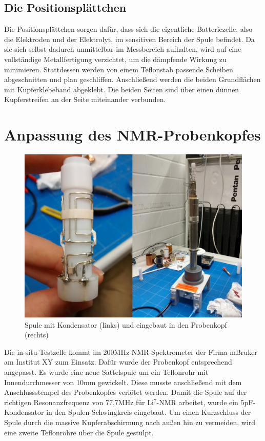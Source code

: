 \documentclass[a4paper, 11pt, headsepline,footsepline,twoside,abstract]{scrbook}
\begin{document}
\subsection{Die Positionsplättchen}
Die Positionsplättchen sorgen dafür, dass sich die eigentliche Batteriezelle, also die Elektroden und der Elektrolyt, im sensitiven Bereich der Spule befindet. Da sie sich selbst dadurch unmittelbar im Messbereich aufhalten, wird auf eine vollständige Metallfertigung verzichtet, um die dämpfende Wirkung zu minimieren. Stattdessen werden von einem Teflonstab passende Scheiben abgeschnitten und plan geschliffen. Anschließend werden die beiden Grundflächen mit Kupferklebeband abgeklebt. Die beiden Seiten sind über einen dünnen Kupferstreifen an der Seite miteinander verbunden. 
\section{Anpassung des NMR-Probenkopfes}
\begin{figure}
	\centering
	\includegraphics[width=0.85\columnwidth]{images/Platzhalter_Spule.jpg}
	\caption{Spule mit Kondensator (links) und eingebaut in den Probenkopf (rechts)}
	\label{spule}
\end{figure}
Die in-situ-Testzelle kommt im 200MHz-NMR-Spektrometer der Firma mBruker am Institut XY zum Einsatz. Dafür wurde der Probenkopf entsprechend angepasst. Es wurde eine neue Sattelspule um ein Teflonrohr mit Innendurchmesser von 10mm gewickelt. Diese musste anschließend mit dem Anschlussstempel des Probenkopfes verlötet werden. Damit die Spule auf der richtigen Resonanzfrequenz von 77,7MHz für Li$^7$-NMR arbeitet, wurde ein 5pF-Kondensator in den Spulen-Schwingkreis eingebaut. Um einen Kurzschluss der Spule durch die massive Kupferabschirmung nach außen hin zu vermeiden, wird eine zweite Teflonröhre über die Spule gestülpt.
\end{document}
